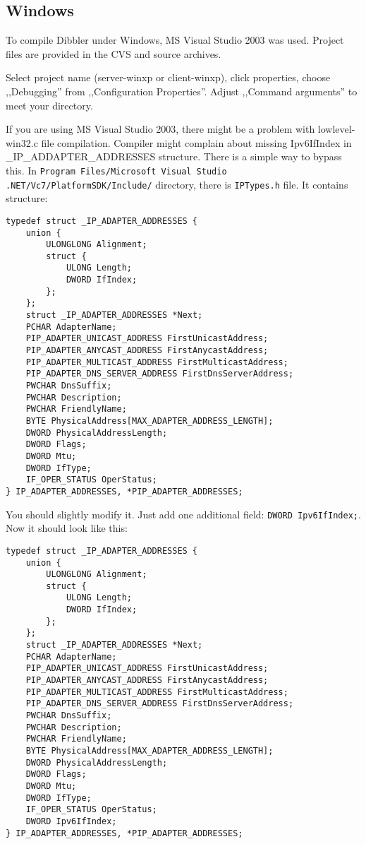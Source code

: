\subsection{Windows}
To compile Dibbler under Windows, MS Visual Studio 2003 was
used. Project files are provided in the CVS and source archives.

Select project name (server-winxp or client-winxp), click properties,
choose ,,Debugging'' from ,,Configuration Properties''. Adjust ,,Command
arguments'' to meet your directory.

If you are using MS Visual Studio 2003, there might be a problem with
lowlevel-win32.c file compilation. Compiler might complain about
missing Ipv6IfIndex in \_IP\_ADDAPTER\_ADDRESSES structure. There is a simple way
to bypass this.  In \verb+Program Files/Microsoft Visual Studio .NET/Vc7/PlatformSDK/Include/+ directory, there is \verb+IPTypes.h+
file. It contains structure:

\begin{verbatim}
typedef struct _IP_ADAPTER_ADDRESSES {
    union {
        ULONGLONG Alignment;
        struct {
            ULONG Length;
            DWORD IfIndex;
        };
    };
    struct _IP_ADAPTER_ADDRESSES *Next;
    PCHAR AdapterName;
    PIP_ADAPTER_UNICAST_ADDRESS FirstUnicastAddress;
    PIP_ADAPTER_ANYCAST_ADDRESS FirstAnycastAddress;
    PIP_ADAPTER_MULTICAST_ADDRESS FirstMulticastAddress;
    PIP_ADAPTER_DNS_SERVER_ADDRESS FirstDnsServerAddress;
    PWCHAR DnsSuffix;
    PWCHAR Description;
    PWCHAR FriendlyName;
    BYTE PhysicalAddress[MAX_ADAPTER_ADDRESS_LENGTH];
    DWORD PhysicalAddressLength;
    DWORD Flags;
    DWORD Mtu;
    DWORD IfType;
    IF_OPER_STATUS OperStatus;
} IP_ADAPTER_ADDRESSES, *PIP_ADAPTER_ADDRESSES;
\end{verbatim}

You should slightly modify it. Just add one additional field:
\verb+DWORD Ipv6IfIndex;+. Now it should look like this:

\begin{verbatim}
typedef struct _IP_ADAPTER_ADDRESSES {
    union {
        ULONGLONG Alignment;
        struct {
            ULONG Length;
            DWORD IfIndex;
        };
    };
    struct _IP_ADAPTER_ADDRESSES *Next;
    PCHAR AdapterName;
    PIP_ADAPTER_UNICAST_ADDRESS FirstUnicastAddress;
    PIP_ADAPTER_ANYCAST_ADDRESS FirstAnycastAddress;
    PIP_ADAPTER_MULTICAST_ADDRESS FirstMulticastAddress;
    PIP_ADAPTER_DNS_SERVER_ADDRESS FirstDnsServerAddress;
    PWCHAR DnsSuffix;
    PWCHAR Description;
    PWCHAR FriendlyName;
    BYTE PhysicalAddress[MAX_ADAPTER_ADDRESS_LENGTH];
    DWORD PhysicalAddressLength;
    DWORD Flags;
    DWORD Mtu;
    DWORD IfType;
    IF_OPER_STATUS OperStatus;
    DWORD Ipv6IfIndex;
} IP_ADAPTER_ADDRESSES, *PIP_ADAPTER_ADDRESSES;
\end{verbatim}

